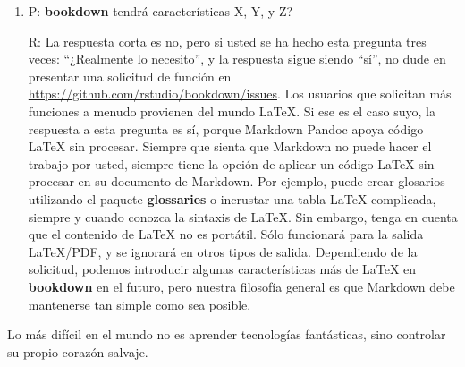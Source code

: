\documentclass[12pt,]{krantz}
\theoremstyle{definition}
\theoremstyle{definition}
\theoremstyle{remark}
\begin{document}
\begin{enumerate}
\def\labelenumi{\arabic{enumi}.}
\item
  P: \textbf{bookdown} tendrá características X, Y, y Z?

  R: La respuesta corta es no, pero si usted se ha hecho esta pregunta
  tres veces: ``¿Realmente lo necesito'', y la respuesta sigue siendo
  ``sí'', no dude en presentar una solicitud de función en
  \url{https://github.com/rstudio/bookdown/issues}. Los usuarios que
  solicitan más funciones a menudo provienen del mundo LaTeX. Si ese es
  el caso suyo, la respuesta a esta pregunta es sí, porque Markdown
  Pandoc apoya código LaTeX sin procesar. Siempre que sienta que
  Markdown no puede hacer el trabajo por usted, siempre tiene la opción
  de aplicar un código LaTeX sin procesar en su documento de Markdown.
  Por ejemplo, puede crear glosarios utilizando el paquete
  \textbf{glossaries} o incrustar una tabla LaTeX complicada, siempre y
  cuando conozca la sintaxis de LaTeX. Sin embargo, tenga en cuenta que
  el contenido de LaTeX no es portátil. Sólo funcionará para la salida
  LaTeX/PDF, y se ignorará en otros tipos de salida. Dependiendo de la
  solicitud, podemos introducir algunas características más de LaTeX en
  \textbf{bookdown} en el futuro, pero nuestra filosofía general es que
  Markdown debe mantenerse tan simple como sea posible.
\end{enumerate}

Lo más difícil en el mundo no es aprender tecnologías fantásticas, sino
controlar su propio corazón salvaje.



\backmatter
\printindex
\end{document}
